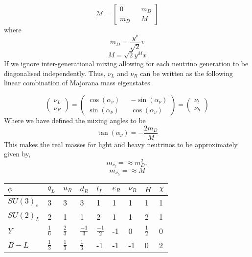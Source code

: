\documentclass[11pt,twoside,a4paper]{article}
\begin{document}
\begin{equation}
\mathcal{M}=\begin{bmatrix}
0 && m_D \\
m_D && M 
\end{bmatrix}
\end{equation}
where  
\begin{equation}
m_D=\frac{y^\nu}{\sqrt{2}} v  
\end{equation}
\begin{equation}
M=\sqrt{2} y^M x  
\end{equation}
If we ignore inter-generational mixing allowing for each neutrino generation to be diagonalised  independently. Thus, $\nu_L$ and $\nu_R$  can be written as the following linear combination of Majorana mass eigenstates 

\begin{equation}
\begin{pmatrix}
\nu_L \\
\nu_R 
\end{pmatrix}= \begin{pmatrix}
\cos(\alpha_\nu) && -\sin(\alpha_\nu) \\
\sin(\alpha_\nu) && \cos(\alpha_\nu)
\end{pmatrix}= \begin{pmatrix}
\nu_l  \\
\nu_h
\end{pmatrix} 
\end{equation}
Where we have defined the mixing angles to be 
\begin{equation}
\tan(\alpha_\nu)=-\frac{2m_D}{M}
\end{equation}
This makes the real masses for light and heavy neutrinos to be approximately given by,
\begin{equation}
m_{\nu_l}= \approx m_D^2 , 
\end{equation}
\begin{equation}
m_{\nu_h}=\approx M
\end{equation}
\begin{table}[h]
\centering
\begin{tabular}{|l|l|l|l|l|l|l|l|l|}
\hline
 $\phi$& $q_L$  & $u_R$ & $d_R$ & $l_L$  & $e_R$ & $\nu_R$  &  $H$  & $\chi$  \\ \hline
 $SU(3)_c$& 3 & 3 & 3 & 1 & 1 & 1 & 1  & 1  \\
 $SU(2)_L$& 2  & 1 & 1 & 2 & 1 & 1 & 2  & 1 \\
$Y$ & $\frac{1}{6}$ & $\frac{2}{3}$  & $\frac{-1}{3}$  & $\frac{-1}{2}$ & -1 & 0 & $\frac{1}{2}$ & 0 \\
$B-L$ & $\frac{1}{3}$ & $\frac{1}{3}$ & $\frac{1}{3}$  & -1  & -1 &-1  & 0  & 2  \\ \hline
\end{tabular}
\end{table}
\end{document}

